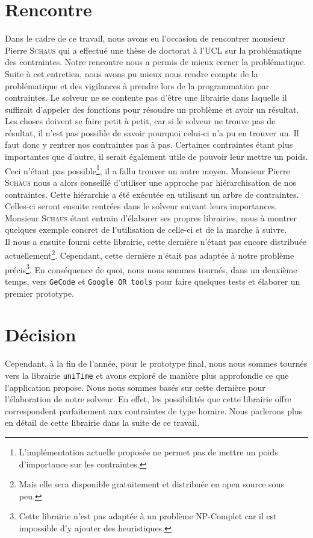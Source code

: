\section{Rencontre}
Dans le cadre de ce travail, nous avons eu l'occasion de rencontrer monsieur Pierre \textsc{Schaus} qui a effectué une thèse de doctorat à l'UCL sur la problématique des contraintes. Notre rencontre nous a permis de mieux cerner la problématique.
\newline
\indent
Suite à cet entretien, nous avons pu mieux nous rendre compte de la problématique et des vigilances à prendre lors de la programmation par contraintes. Le solveur ne se contente pas d'être une librairie dans laquelle il suffirait d'appeler des fonctions pour résoudre un problème et avoir un résultat. Les choses doivent se faire petit à petit, car si le solveur ne trouve pas de résultat, il n'est pas possible de savoir pourquoi celui-ci n'a pu en trouver un. 
\newline
\indent
Il faut donc y rentrer nos contraintes pas à pas. Certaines contraintes étant plus importantes que d'autre, il serait également utile de pouvoir leur mettre un poids. Ceci n'étant pas possible\footnote{L'implémentation actuelle proposée ne permet pas de mettre un poids d'importance sur les contraintes.}, il a fallu trouver un autre moyen. Monsieur Pierre \textsc{Schaus} nous a alors conseillé d'utiliser une approche par hiérarchisation de nos contraintes. Cette hiérarchie a été exécutée en utilisant un arbre de contraintes. Celles-ci seront ensuite rentrées dans le solveur suivant leurs importances. Monsieur \textsc{Schaus} étant entrain d'élaborer ses propres librairies, nous à montrer quelques exemple concret de l'utilisation de celle-ci et de la marche à suivre.\\
\newline
\indent
Il nous a ensuite fourni cette librairie, cette dernière n'étant pas encore distribuée actuellement\footnote{Mais elle sera disponible gratuitement et distribuée en open source sous peu.}. Cependant, cette dernière n'était pas adaptée à notre problème précis\footnote{Cette librairie n'est pas adaptée à un problème NP-Complet car il est impossible d'y ajouter des heuristiques.}. En conséquence de quoi, nous nous sommes tournés, dans un deuxième temps, vers  \texttt{GeCode} et \texttt{Google OR tools} pour faire quelques tests et élaborer un premier prototype.

\section{Décision}

Cependant, à la fin de l'année, pour le prototype final, nous nous sommes tournés vers la librairie \texttt{uniTime} et avons exploré de manière plus approfondie ce que l'application propose. Nous nous sommes basés sur cette dernière pour l'élaboration de notre solveur. En effet, les possibilités que cette librairie offre correspondent parfaitement aux contraintes de type horaire. Nous parlerons plus en détail de cette librairie dans la suite de ce travail.



